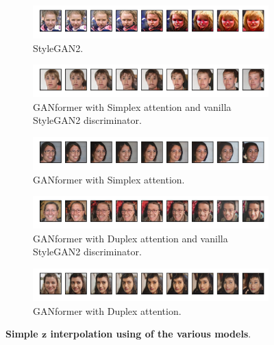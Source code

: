 \documentclass{article}
\begin{document}
\begin{figure}[htpb]
	\centering
	\begin{subfigure}{\linewidth}
		\includegraphics[width=\linewidth]{ffhq-interpolation_Stylegan2.png}
		\vspace{-7mm}
		\caption{StyleGAN2.} 
	\end{subfigure}
	\begin{subfigure}{\linewidth}
		\includegraphics[width=\linewidth]{ffhq-interpolation_GANFormerSimplexNoAtt.png}
		\vspace{-7mm}
		\caption{GANformer with Simplex attention and vanilla StyleGAN2 discriminator.}
	\end{subfigure}
	\begin{subfigure}{\linewidth}
		\includegraphics[width=\linewidth]{ffhq-interpolation_GANFormerSimplexAtt.png}
		\vspace{-7mm}
		\caption{GANformer with Simplex attention.}
	\end{subfigure}
	\begin{subfigure}{\linewidth}
		\includegraphics[width=\linewidth]{ffhq-interpolation_GANFormerDuplexNoAtt.png}
		\vspace{-7mm}
		\caption{GANformer with Duplex attention and vanilla StyleGAN2 discriminator.}
	\end{subfigure}
	\begin{subfigure}{\linewidth}
		\includegraphics[width=\linewidth]{ffhq-interpolation_GANFormerDuplexAtt.png}
		\vspace{-7mm}
		\caption{GANformer with Duplex attention.}
	\end{subfigure}
	\vspace{3mm}
	\caption{\textbf{Simple $\mathbf{z}$ interpolation using of the various models}.} 
	\label{fig:interpolation-ffhq}
\end{figure}


\clearpage


\clearpage
\end{document}
